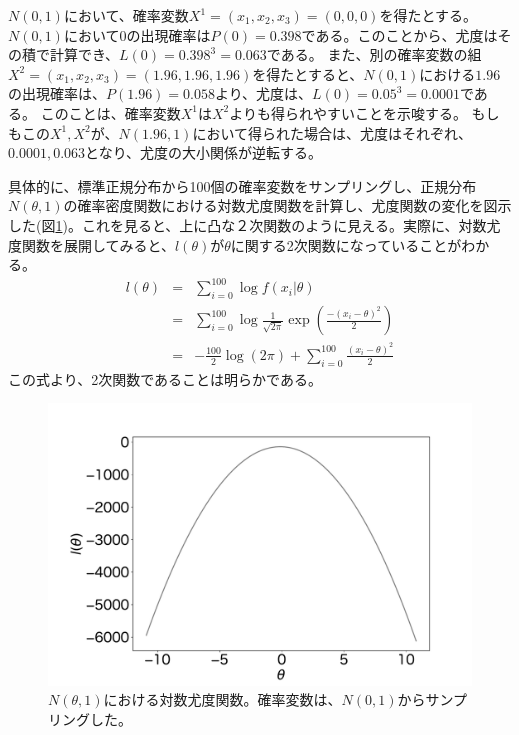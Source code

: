 $N(0,1)$において、確率変数$X^1=(x_1,x_2,x_3)=(0,0,0)$を得たとする。$N(0,1)$において$0$の出現確率は$P(0)=0.398$である。このことから、尤度はその積で計算でき、$L(0)=0.398^3=0.063$である。
また、別の確率変数の組$X^2=(x_1,x_2,x_3)=(1.96,1.96,1.96)$を得たとすると、$N(0,1)$における$1.96$の出現確率は、$P(1.96)=0.058$より、尤度は、$L(0)=0.05^3=0.0001$である。
このことは、確率変数$X^1$は$X^2$よりも得られやすいことを示唆する。
もしもこの$X^1,X^2$が、$N(1.96,1)$において得られた場合は、尤度はそれぞれ、$0.0001,0.063$となり、尤度の大小関係が逆転する。


具体的に、標準正規分布から100個の確率変数をサンプリングし、正規分布$N(\theta,1)$の確率密度関数における対数尤度関数を計算し、尤度関数の変化を図示した(図\ref{fig:loglikelihood_function})。これを見ると、上に凸な２次関数のように見える。実際に、対数尤度関数を展開してみると、$l(\theta)$が$\theta$に関する2次関数になっていることがわかる。
\begin{eqnarray}
    l(\theta) &=& \sum_{i=0}^{100} \log f(x_i|\theta) \\
    &=& \sum_{i=0}^{100} \log \frac{1}{\sqrt{2\pi}}\exp\left( \frac{-(x_i-\theta)^2}{2} \right) \\
    &=&  -\frac{100}{2}\log(2\pi)+\sum_{i=0}^{100}\frac{(x_i-\theta)^2}{2}
\end{eqnarray}
この式より、2次関数であることは明らかである。

\begin{figure}
    \centering
    \includegraphics[width=15cm]{./image/02_/loglikelihood_function.pdf}
    \caption{$N(\theta,1)$における対数尤度関数。確率変数は、$N(0,1)$からサンプリングした。}
    \label{fig:loglikelihood_function}
\end{figure}

